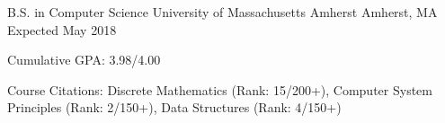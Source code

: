 \begin{cventries}
    \vspace{-7pt}
  \cventry
    {B.S. in Computer Science}
    {University of Massachusetts Amherst}
    {Amherst, MA}
    {Expected May 2018}
    {
      \begin{cvitems}
        \item {Cumulative GPA: 3.98/4.00}
        \item{Course Citations: Discrete Mathematics (Rank: 15/200+), Computer System Principles (Rank: 2/150+), Data Structures (Rank: 4/150+)}
      \end{cvitems}
    }
\end{cventries}
